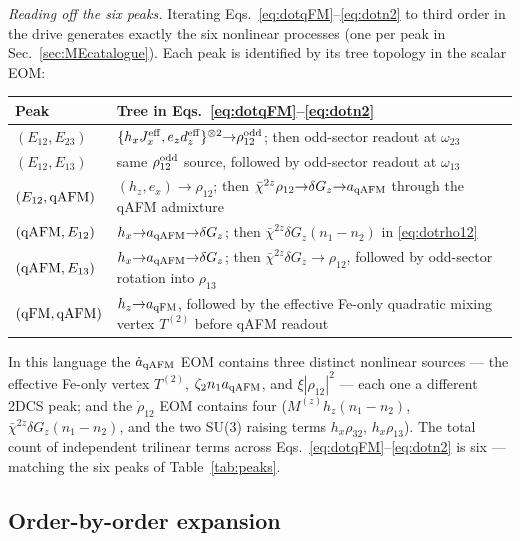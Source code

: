 \documentclass[reprint,amsmath,amssymb,aps,prb,longbibliography]{revtex4-2}
\begin{document}
\medskip
\noindent\emph{Reading off the six peaks.} Iterating
Eqs.~\eqref{eq:dotqFM}--\eqref{eq:dotn2} to third order in the drive
generates exactly the six nonlinear processes (one per peak
in Sec.~\ref{sec:MEcatalogue}). Each peak is identified by its tree
topology in the scalar EOM:
\begin{widetext}
\begin{center}
\renewcommand{\arraystretch}{1.15}
\begin{tabular}{ll}
\hline
Peak & Tree in Eqs.~\eqref{eq:dotqFM}--\eqref{eq:dotn2}\\
\hline
$(E_{12},E_{23})$  & $\{h_xJ_x^{\rm eff},e_z d_z^{\rm eff}\}^{\otimes 2}{\to}\rho_{12}^{\rm odd}$; then odd-sector readout at $\omega_{23}$\\
$(E_{12},E_{13})$  & same $\rho_{12}^{\rm odd}$ source, followed by odd-sector readout at $\omega_{13}$\\
$(E_{12},{\rm qAFM})$& $(h_z,e_x){\to}\rho_{12}$; then $\bar\chi^{2z}\rho_{12}{\to}\delta G_z{\to}a_{\rm qAFM}$ through the qAFM admixture\\
$({\rm qAFM},E_{12})$& $h_x{\to}a_{\rm qAFM}{\to}\delta G_z$; then $\bar\chi^{2z}\delta G_z(n_1-n_2)$ in \eqref{eq:dotrho12}\\
$({\rm qAFM},E_{13})$& $h_x{\to}a_{\rm qAFM}{\to}\delta G_z$; then $\bar\chi^{2z}\delta G_z{\to}\rho_{12}$, followed by odd-sector rotation into $\rho_{13}$\\
$({\rm qFM},{\rm qAFM})$& $h_z{\to}a_{\rm qFM}$, followed by the effective Fe-only quadratic mixing vertex $T^{(2)}$ before qAFM readout\\
\hline
\end{tabular}
\end{center}
\end{widetext}

In this language the $\dot a_{\rm qAFM}$ EOM contains three distinct
nonlinear sources --- the effective Fe-only vertex $T^{(2)}$,
$\zeta_2 n_1 a_{\rm qAFM}$, and $\xi|\rho_{12}|^2$ --- each one a different
2DCS peak; and the
$\dot\rho_{12}$ EOM contains four ($M^{(z)}h_z(n_1-n_2)$,
$\bar\chi^{2z}\delta G_z(n_1-n_2)$, and the two SU(3) raising terms
$h_x\rho_{32}$, $h_x\rho_{13}$). The total count of independent
trilinear terms across Eqs.~\eqref{eq:dotqFM}--\eqref{eq:dotn2} is
six --- matching the six peaks of Table~\ref{tab:peaks}.

\subsection{Order-by-order expansion}
\end{document}
